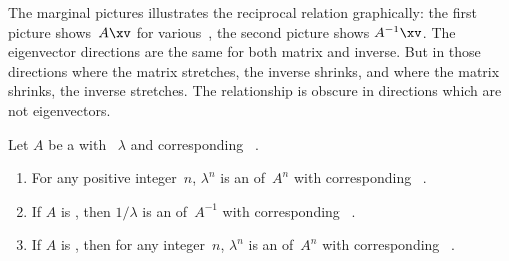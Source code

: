 \begin{example}
\begin{itemize}
The marginal pictures illustrates the reciprocal relation graphically:
the first picture shows~\(A\xv\) for various~\xv, the second picture shows \(A^{-1}\xv\).
The eigenvector directions are the same for both matrix and inverse.
But in those directions where the matrix stretches, the inverse shrinks, and where the matrix shrinks, the inverse stretches.
The relationship is obscure in directions which are not eigenvectors.
\end{itemize}
\end{example}




\begin{theorem} \label{thm:ematpow} 
Let \(A\) be a  with ~\(\lambda\) and corresponding ~\xv.
\begin{enumerate}
\item\label{thm:ematpow:i} For any positive integer~\(n\), \(\lambda^n\) is an  of~\(A^n\) with corresponding ~\xv.
\item\label{thm:ematpow:ii} If \(A\) is , then \(1/\lambda\) is an  of~\(A^{-1}\) with corresponding ~\xv.
\item\label{thm:ematpow:iii} If \(A\) is , then for any integer~\(n\), \(\lambda^n\) is an  of~\(A^n\) with corresponding ~\xv.
\end{enumerate}
\end{theorem}
